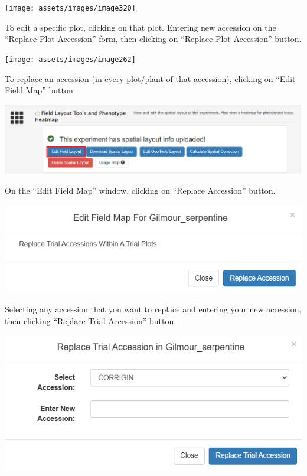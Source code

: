 \documentclass[
  12pt,
]{book}
\begin{document}
\begin{center}\texttt{[image: assets/images/image320]} \end{center}

To edit a specific plot, clicking on that plot. Entering new accession on the ``Replace Plot Accession'' form, then clicking on ``Replace Plot Accession'' button.

\begin{center}\texttt{[image: assets/images/image262]} \end{center}

To replace an accession (in every plot/plant of that accession), clicking on ``Edit Field Map'' button.

\begin{center}\includegraphics[width=0.95\linewidth]{assets/images/image173} \end{center}

On the ``Edit Field Map'' window, clicking on ``Replace Accession'' button.

\begin{center}\includegraphics[width=0.95\linewidth]{assets/images/image87} \end{center}

Selecting any accession that you want to replace and entering your new accession, then clicking ``Replace Trial Accession'' button.

\begin{center}\includegraphics[width=0.95\linewidth]{assets/images/image85} \end{center}
\end{document}
